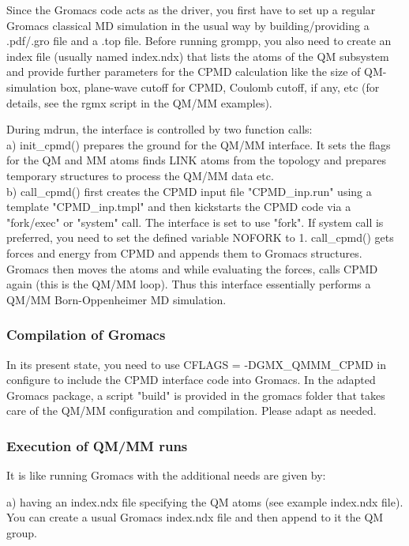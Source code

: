 \documentclass[twoside,10pt,titlepage,a4paper]{article}
\begin{document}
Since the Gromacs code acts as the driver, you first have to set up a regular
Gromacs classical MD simulation in the usual way by building/providing
a .pdf/.gro file and a .top file. Before running grompp, you also need
to create an index file (usually named index.ndx) that lists the atoms
of the QM subsystem and provide further parameters for the CPMD calculation
like the size of QM-simulation box, plane-wave cutoff for CPMD, Coulomb cutoff,
if any, etc (for details, see the rgmx script in the QM/MM examples).

During mdrun, the interface is controlled by two function  calls:\\
a) init\_cpmd() prepares the ground for the QM/MM interface. It sets the flags
for the QM and MM atoms finds LINK atoms from the topology and prepares temporary
structures to process the QM/MM data etc.\\
b) call\_cpmd() first creates the CPMD input file "CPMD\_inp.run" using a template
"CPMD\_inp.tmpl" and then kickstarts the CPMD code via a "fork/exec" or "system" call.
The interface is set to use "fork". If system call is preferred, you need to set
the defined variable NOFORK to 1. call\_cpmd() gets forces and energy from CPMD
and appends them to Gromacs structures. Gromacs then moves the atoms and while
evaluating the forces, calls CPMD again (this is the QM/MM loop). Thus this interface
essentially performs a QM/MM Born-Oppenheimer MD simulation.\\

\subsubsection{Compilation of Gromacs}
In its present state, you need to use CFLAGS = -DGMX\_QMMM\_CPMD
in configure to include the CPMD interface code into Gromacs.
In the adapted Gromacs package, a script "build" is provided in the gromacs folder
that takes care of the QM/MM configuration and compilation. Please adapt
as needed.

\subsubsection{Execution of QM/MM runs}
It is like running Gromacs with the additional needs are given by:

a) having an index.ndx file specifying the QM atoms (see example index.ndx file).
You can create a usual Gromacs index.ndx file and then append to it the QM
group.
\end{document}
